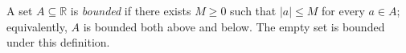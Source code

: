 
A set $A\subseteq\mathbb R$ is \emph{bounded} if there exists $M\ge0$ such that $|a|\le M$ for every $a\in A$; equivalently, $A$ is bounded both above and below. The empty set is bounded under this definition.
